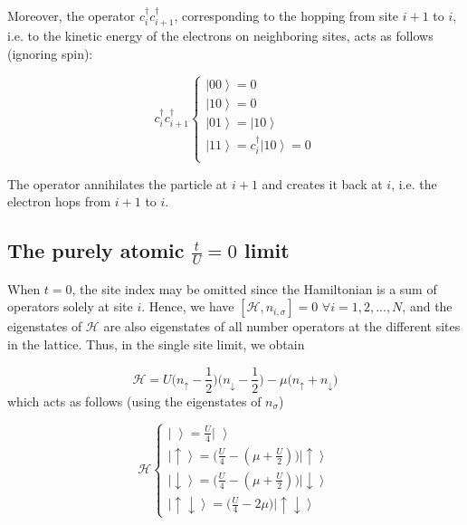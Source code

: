 Moreover, the operator $c_i^\dagger c_{i+1}^\dagger$, corresponding to the hopping from site $i+1$ to $i$, i.e. to the kinetic energy of the electrons on neighboring sites, acts as follows (ignoring spin):

\begin{equation}
c_i^\dagger c_{i+1}^\dagger \begin{cases}
\left|0 0 \right\rangle = 0 \\
\left|1 0 \right\rangle =  0 \\
\left|0 1 \right\rangle =  \left| 1 0 \right\rangle \\
\left|1 1 \right\rangle =  c_i^\dagger \left| 1 0  \right\rangle = 0 \\
\end{cases}
\end{equation}

The operator annihilates the particle at $i+1$ and creates it back at $i$, i.e. the electron hops from $i+1$ to $i$.

\subsection{The purely atomic $\frac{t}{U} = 0$ limit}
\label{subsec:atomic}

When $t = 0$, the site index may be omitted since the Hamiltonian is a sum of operators solely at site $i$.
Hence, we have $[ \mathcal{H}, n_{i,\sigma} ] = 0 \,\, \forall i = 1, 2,..., N $, and the eigenstates of $\mathcal{H}$ are also eigenstates of all number operators at the different sites in the lattice.
Thus, in the single site limit, we obtain

\begin{equation}
\mathcal{H} = U \bigg(n_\uparrow - \frac{1}{2} \bigg) \bigg(n_\downarrow - \frac{1}{2} \bigg) - \mu \bigg( n_\uparrow + n_\downarrow \bigg)
\end{equation}
which acts as follows (using the eigenstates of $n_\sigma$)

\begin{equation}
\mathcal{H} \begin{cases}
\left| \,\, \right\rangle = \frac{U}{4} \left| \,\, \right\rangle \\
\left| \uparrow \right\rangle = \bigg( \frac{U}{4} - (\mu + \frac{U}{2} ) \bigg) \left| \uparrow \right\rangle \\
\left| \downarrow \right\rangle = \bigg( \frac{U}{4} - (\mu + \frac{U}{2} ) \bigg) \left| \downarrow \right\rangle \\
\left| \uparrow \downarrow \right\rangle = \bigg( \frac{U}{4} - 2 \mu \bigg) \left| \uparrow \downarrow \right\rangle
\end{cases}
\end{equation}

